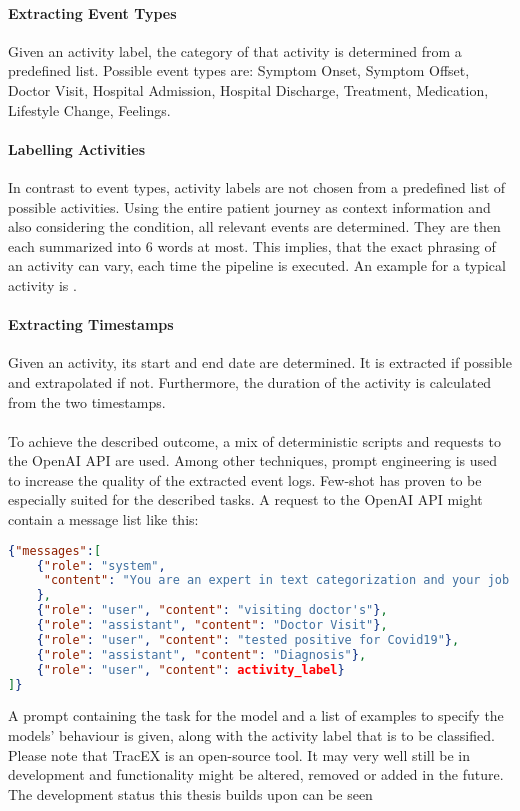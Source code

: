 \paragraph{Extracting Event Types} Given an activity label, the category of that activity is determined from a predefined list. Possible event types are: Symptom Onset, Symptom Offset, Doctor Visit, Hospital Admission, Hospital Discharge, Treatment, Medication, Lifestyle Change, Feelings.
\paragraph{Labelling Activities} In contrast to event types, activity labels are not chosen from a predefined list of possible activities. Using the entire patient journey as context information and also considering the condition, all relevant events are determined. They are then each summarized into 6 words at most. This implies, that the exact phrasing of an activity can vary, each time the pipeline is executed. An example for a typical activity is .
\paragraph{Extracting Timestamps} Given an activity, its start and end date are determined. It is extracted if possible and extrapolated if not. Furthermore, the duration of the activity is calculated from the two timestamps.\\\\
To achieve the described outcome, a mix of deterministic scripts and requests to the OpenAI API are used. Among other techniques, prompt engineering is used to increase the quality of the extracted event logs.
Few-shot has proven to be especially suited for the described tasks. A request to the OpenAI API might contain a message list like this:
\begin{lstlisting}[language=json, caption={Few-shot prompt to categorize activities into event types}, label={lst:few-shot}]
{"messages":[
	{"role": "system",  
     "content": "You are an expert in text categorization and your job is to take a given activity label and to classify it into one of the following event types: 'Symptom Onset', 'Symptom Offset', 'Diagnosis', 'Doctor Visit', 'Treatment', 'Hospital Admission', 'Hospital Discharge', 'Medication', 'Lifestyle Change' and 'Feelings'. Please consider the capitalization.",  
	},  
    {"role": "user", "content": "visiting doctor's"},  
    {"role": "assistant", "content": "Doctor Visit"},  
    {"role": "user", "content": "tested positive for Covid19"},
    {"role": "assistant", "content": "Diagnosis"},  
    {"role": "user", "content": activity_label}  
]}
\end{lstlisting}
A prompt containing the task for the model and a list of examples to specify the models' behaviour is given, along with the activity label that is to be classified.
Please note that TracEX is an open-source tool. It may very well still be in development and functionality might be altered, removed or added in the future. The development status this thesis builds upon can be seen 
